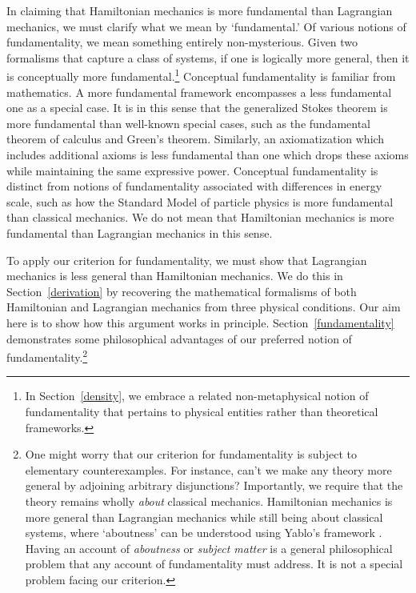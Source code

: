 \documentclass[12pt, english, twoside]{article} %
\begin{document}
In claiming that Hamiltonian mechanics is more fundamental than Lagrangian mechanics, we must clarify what we mean by `fundamental.' Of various notions of fundamentality, we mean something entirely non-mysterious. Given two formalisms that capture a class of systems, if one is logically more general, then it is conceptually more fundamental.\footnote{In Section~\ref{density}, we embrace a related non-metaphysical notion of fundamentality that pertains to physical entities rather than theoretical frameworks.} Conceptual fundamentality is familiar from mathematics. A more fundamental framework encompasses a less fundamental one as a special case. It is in this sense that the generalized Stokes theorem is more fundamental than well-known special cases, such as the fundamental theorem of calculus and Green's theorem. Similarly, an axiomatization which includes additional axioms is less fundamental than one which drops these axioms while maintaining the same expressive power. Conceptual fundamentality is distinct from notions of fundamentality associated with differences in energy scale, such as how the Standard Model of particle physics is more fundamental than classical mechanics. We do not mean that Hamiltonian mechanics is more fundamental than Lagrangian mechanics in this sense. 

To apply our criterion for fundamentality, we must show that Lagrangian mechanics is less general than Hamiltonian mechanics. We do this in Section~\ref{derivation} by recovering the mathematical formalisms of both Hamiltonian and Lagrangian mechanics from three physical conditions. Our aim here is to show how this argument works in principle. Section~\ref{fundamentality} demonstrates some philosophical advantages of our preferred notion of fundamentality.\footnote{One might worry that our criterion for fundamentality is subject to elementary counterexamples. For instance, can't we make any theory more general by adjoining arbitrary disjunctions? Importantly, we require that the theory remains wholly \textit{about} classical mechanics. Hamiltonian mechanics is more general than Lagrangian mechanics while still being about classical systems, where `aboutness' can be understood using Yablo's framework \parencites*[]{Yablo}. Having an account of \textit{aboutness} or \textit{subject matter} is a general philosophical problem that any account of fundamentality must address. It is not a special problem facing our criterion.} 
\end{document}
